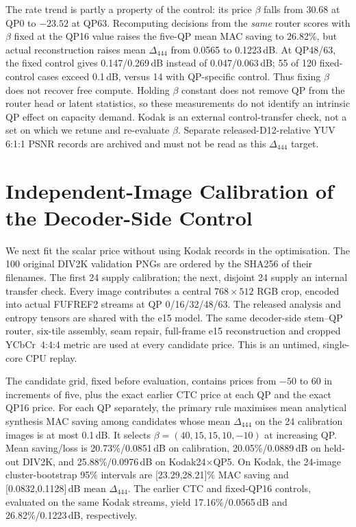 The rate trend is partly a property of the control: its price $\beta$
falls from 30.68 at QP0 to $-23.52$ at QP63. Recomputing decisions from
the \emph{same} router scores with $\beta$ fixed at the QP16 value raises
the five-QP mean MAC saving to 26.82\%, but actual reconstruction raises
mean $\Delta_{444}$ from 0.0565 to 0.1223\,dB. At QP48/63, the fixed
control gives 0.147/0.269\,dB instead of 0.047/0.063\,dB; 55 of 120
fixed-control cases exceed 0.1\,dB, versus 14 with QP-specific control.
Thus fixing $\beta$ does not recover free compute. Holding $\beta$ constant
does not remove QP from the router head or latent statistics, so these
measurements do not identify an intrinsic QP effect on capacity demand.
Kodak is an external control-transfer check, not a set on which we retune
and re-evaluate $\beta$. Separate released-D12-relative YUV 6:1:1 PSNR
records are archived and must not be read as this $\Delta_{444}$ target.

\section{Independent-Image Calibration of the Decoder-Side Control}

We next fit the scalar price without using Kodak records in the optimisation.
The 100 original DIV2K validation PNGs are ordered by the SHA256 of their
filenames. The first 24 supply calibration; the next, disjoint 24 supply an
internal transfer check. Every image contributes a central $768\times512$
RGB crop, encoded into actual FUFREF2 streams at QP 0/16/32/48/63.
The released analysis and entropy tensors are shared with the e15 model.
The same decoder-side stem--QP router, six-tile assembly, seam repair,
full-frame e15 reconstruction and cropped YCbCr~4:4:4 metric are used at
every candidate price. This is an untimed, single-core CPU replay.

The candidate grid, fixed before evaluation, contains prices from $-50$ to
$60$ in increments of five, plus the exact earlier CTC price at each QP
and the exact QP16 price. For each QP separately, the primary rule maximises
mean analytical synthesis MAC saving among candidates whose mean
$\Delta_{444}$ on the 24 calibration images is at most 0.1\,dB.
It selects $\beta=(40,15,15,10,-10)$ at increasing QP. Mean saving/loss
is 20.73\%/0.0851\,dB on calibration, 20.05\%/0.0889\,dB on held-out
DIV2K, and 25.88\%/0.0976\,dB on Kodak24$\times$QP5. On Kodak, the
24-image cluster-bootstrap 95\% intervals are [23.29,28.21]\% MAC saving
and [0.0832,0.1128]\,dB mean $\Delta_{444}$. The earlier CTC and fixed-QP16
controls, evaluated on the same Kodak streams, yield 17.16\%/0.0565\,dB
and 26.82\%/0.1223\,dB, respectively.

